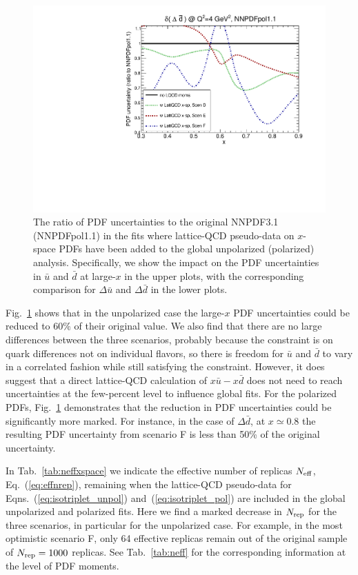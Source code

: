 \begin{figure}[!t]
\includegraphics[scale=0.45]{plots/xdbar-pol-lattice-relerr-xdata-xspace.pdf}
\caption{\small The ratio of PDF uncertainties to the original
  NNPDF3.1 (NNPDFpol1.1) in the fits where lattice-QCD pseudo-data
  on $x$-space PDFs have been added to the global unpolarized
  (polarized) analysis.
  Specifically, we show the impact on the PDF uncertainties
  in $\bar{u}$ and $\bar{d}$ at large-$x$ in the upper
  plots, with the corresponding comparison for $\Delta\bar{u}$
  and $\Delta\bar{d}$ in the lower plots.
}    
\label{fig:impactxspace}
\end{figure}

Fig.~\ref{fig:impactxspace} shows that
in the unpolarized case the large-$x$ PDF uncertainties could be reduced
to $60\%$ of their original value.
%
We also find that there are no large
differences between the three
scenarios,
probably because the constraint is on quark differences not on individual 
flavors, so there is freedom for $\bar u$ and $\bar d$ to vary in a correlated 
fashion while still satisfying the constraint. 
%
However, it does suggest 
that a direct lattice-QCD calculation
of $x \bar{u}-x \bar{d}$ does not need to reach uncertainties
at the few-percent level to influence global fits.
%
For the polarized PDFs, Fig.~\ref{fig:impactxspace} demonstrates that the
reduction in PDF uncertainties could be significantly more marked.
%
For instance, in the case of $\Delta \bar{d}$, at $x\simeq 0.8$
the resulting PDF uncertainty from scenario F is less than 50\%
of the original uncertainty.

In Tab.~\ref{tab:neffxspace} we indicate the effective number of replicas
$N_{\rm eff}$, Eq.~(\ref{eq:effnrep}), remaining when
the lattice-QCD pseudo-data for Eqns.~(\ref{eq:isotriplet_unpol})
and~(\ref{eq:isotriplet_pol}) are included in the global
unpolarized and polarized fits.
%
Here we find a marked decrease in $N_{\rm rep}$
for the three scenarios,
in particular for the unpolarized case.
%
For example, in the most optimistic scenario F, only
64 effective replicas remain out of the
original sample of $N_{\rm rep}=1000$ replicas.
%
See Tab.~\ref{tab:neff} for the corresponding
information at the level of PDF moments.
   

